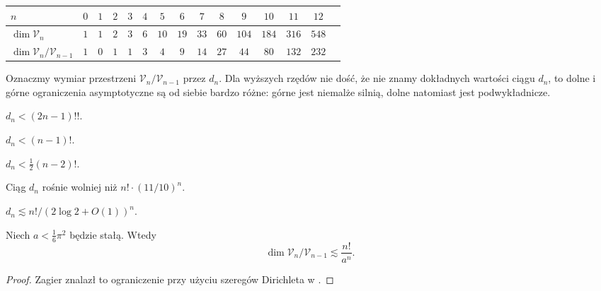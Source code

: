 \renewcommand*{\arraystretch}{1.4}
\footnotesize
\begin{longtable}{lcccccccccccccc}
\hline
    $n$ & $0$ & $1$ & $2$ & $3$ & $4$ & $5$ & $6$ & $7$ & $8$ & $9$ & $10$ & $11$ & $12$ \\ \hline \endhead
    $\dim \mathcal V_n$ & $1$ & $1$ & $2$ & $3$ & $6$ & $10$ & $19$ & $33$ & $60$ & $104$ & $184$ & $316$ & $548$ \\
    $\dim \mathcal V_n / \mathcal V_{n-1}$ & $1$ & $0$ & $1$ & $1$ & $3$ & $4$ & $9$ & $14$ & $27$ & $44$ & $80$ & $132$ & $232$ \\
    \hline
\end{longtable}
\normalsize

Oznaczmy wymiar przestrzeni $\mathcal V_n / \mathcal V_{n-1}$ przez $d_n$.
Dla wyższych rzędów nie dość, że nie znamy dokładnych wartości ciągu $d_n$, to dolne i górne ograniczenia asymptotyczne są od siebie bardzo różne: górne jest niemalże silnią, dolne natomiast jest podwykładnicze.

\begin{proposition}
    $d_n < (2n-1)!!$.
\end{proposition}

\begin{proposition}
    $d_n < (n-1)!$.
\end{proposition}

\begin{proposition}[Ng, 1995]
    $d_n < \frac 12 (n-2)!$.
\end{proposition}

\begin{proposition}[Stojmenow, 1996]
    Ciąg $d_n$ rośnie wolniej niż $n! \cdot (11/10)^n$.
\end{proposition}

\begin{proposition}
    $d_n \lesssim n! / (2 \log 2 + O(1))^n$.
\end{proposition}

\begin{proposition}[Zagier, 2001]
    Niech $a < \frac 1 6 \pi^2$ będzie stałą.
    Wtedy
    \begin{equation}
        \dim \mathcal V_n / \mathcal V_{n-1} \lesssim \frac{n!}{a^n}.
    \end{equation}
\end{proposition}

\begin{proof}
    Zagier znalazł to ograniczenie przy użyciu szeregów Dirichleta w \cite{zagier01}.
\end{proof}

